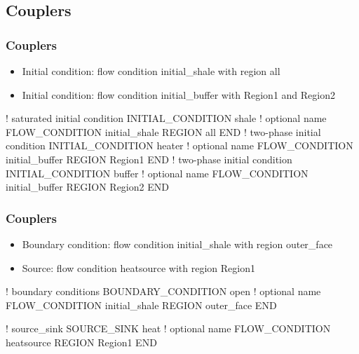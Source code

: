 \documentclass{beamer}
\newcommand\redcomment[1]{{{\color{red} #1}}}
\newcommand\bluecomment[1]{{{\color{blue} #1}}}
\newcommand\greencomment[1]{{{\color{green} #1}}}
\begin{document}
\subsection{Couplers}

\begin{frame}[fragile]\frametitle{Couplers}

\begin{itemize}
  \item \redcomment{Initial condition}: flow condition \greencomment{initial\_shale} with region \greencomment{all}
  \item \redcomment{Initial condition}: flow condition \greencomment{initial\_buffer} with \greencomment{Region1} and \greencomment{Region2}
\end{itemize}

\begin{semiverbatim}\small
\bluecomment{! saturated initial condition}
INITIAL_CONDITION shale \bluecomment{! optional name}
  FLOW_CONDITION initial_shale
  REGION all
END
\bluecomment{! two-phase initial condition}
INITIAL_CONDITION heater \bluecomment{! optional name}
  FLOW_CONDITION initial_buffer
  REGION Region1
END
\bluecomment{! two-phase initial condition}
INITIAL_CONDITION buffer \bluecomment{! optional name}
  FLOW_CONDITION initial_buffer
  REGION Region2
END
\end{semiverbatim}
\end{frame}

\begin{frame}[fragile]\frametitle{Couplers}

\begin{itemize}
  \item \redcomment{Boundary condition}: flow condition \greencomment{initial\_shale} with region \greencomment{outer\_face}
  \item \redcomment{Source}: flow condition \greencomment{heatsource} with region \greencomment{Region1}
\end{itemize}

\begin{semiverbatim}\small
\bluecomment{! boundary conditions}
BOUNDARY_CONDITION open \bluecomment{! optional name}
  FLOW_CONDITION initial_shale
  REGION outer_face
END

\bluecomment{! source_sink }
SOURCE_SINK heat \bluecomment{! optional name}
  FLOW_CONDITION heatsource
  REGION Region1
END
\end{semiverbatim}
\end{frame}
\end{document}
